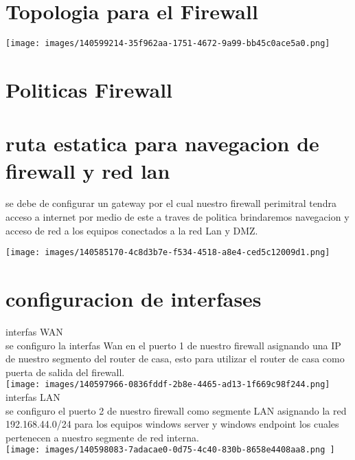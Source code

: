 \documentclass[10pt,a4paper]{article}
\begin{document}
\section{Topologia para el Firewall}

\texttt{[image: images/140599214-35f962aa-1751-4672-9a99-bb45c0ace5a0.png]}

\section{Politicas Firewall}

\section*{ruta estatica para navegacion de firewall y red lan}

se debe de configurar un gateway por el cual nuestro firewall perimitral tendra acceso a internet por medio de este a traves de politica brindaremos navegacion y acceso de red a los equipos conectados a la red Lan y DMZ.

\texttt{[image: images/140585170-4c8d3b7e-f534-4518-a8e4-ced5c12009d1.png]}

\section*{configuracion de interfases}

interfas WAN\\

se configuro la interfas Wan en el puerto 1 de nuestro firewall asignando una IP de nuestro segmento del router de casa, esto para utilizar el router de casa como puerta de salida del firewall.\\

\texttt{[image: images/140597966-0836fddf-2b8e-4465-ad13-1f669c98f244.png]}\\

interfas LAN\\

se configuro el puerto 2 de nuestro firewall como segmente LAN asignando la red 192.168.44.0/24 para los equipos windows server y windows endpoint los cuales pertenecen a nuestro segmente de red interna.\\

\texttt{[image: images/140598083-7adacae0-0d75-4c40-830b-8658e4408aa8.png
]}
\\
\end{document}
